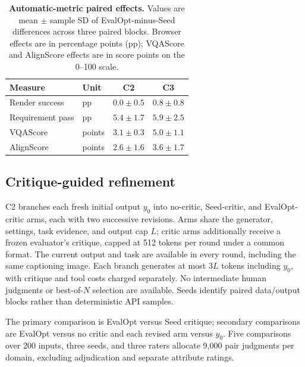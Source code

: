 \begin{table}[!htbp]
\caption{\textbf{Automatic-metric paired effects.}
Values are mean $\pm$ sample SD of EvalOpt-minus-Seed differences across three paired blocks.
Browser effects are in percentage points (pp); VQAScore and AlignScore effects are in score points on the 0--100 scale.}
\label{tab:downstream-effects}
\centering\small
\begin{tabularx}{\linewidth}{@{}Ylcc@{}}
\toprule
Measure & Unit & C2 & C3\\
\midrule
Render success & pp & $0.0\pm0.5$ & $0.8\pm0.8$\\
Requirement pass & pp & $5.4\pm1.7$ & $5.9\pm2.5$\\
VQAScore & points & $3.1\pm0.3$ & $5.0\pm1.1$\\
AlignScore & points & $2.6\pm1.6$ & $3.6\pm1.7$\\
\bottomrule
\end{tabularx}
\end{table}

\subsection{Critique-guided refinement}
C2 branches each fresh initial output $y_0$ into no-critic, Seed-critic, and EvalOpt-critic arms, each with two successive revisions.
Arms share the generator, settings, task evidence, and output cap $L$; critic arms additionally receive a frozen evaluator's critique, capped at 512 tokens per round under a common format.
The current output and task are available in every round, including the same captioning image.
Each branch generates at most $3L$ tokens including $y_0$, with critique and tool costs charged separately.
No intermediate human judgments or best-of-$N$ selection are available.
Seeds identify paired data/output blocks rather than deterministic API samples.

The primary comparison is EvalOpt versus Seed critique; secondary comparisons are EvalOpt versus no critic and each revised arm versus $y_0$.
Five comparisons over 200 inputs, three seeds, and three raters allocate 9,000 pair judgments per domain, excluding adjudication and separate attribute ratings.

